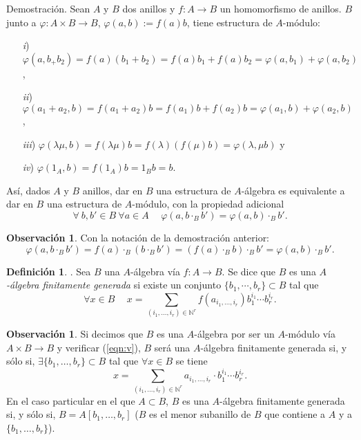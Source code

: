 \documentclass[a4paper,12pt]{article}
\newcommand{\N}{\mathbb{N}}
\theoremstyle{definition}
\newtheorem{definition}[theorem]{Definición}
\newtheorem{remark}[theorem]{Observación}
\begin{document}
Demostración. Sean $A$ y $B$ dos anillos y $f: A\longrightarrow B$ un homomorfismo de anillos. $B$ junto a $\varphi: A\times B\longrightarrow B$, $\varphi(a,b):=f(a)b$, tiene estructura de $A$-módulo:\begin{itemize}
    \item [\textit{i})]$\varphi(a,b_+b_2)=f(a)(b_1+b_2)=f(a)b_1+f(a)b_2=\varphi(a,b_1)+\varphi(a,b_2)$,
    \item[\textit{ii})]$\varphi(a_1+a_2,b)=f(a_1+a_2)b=f(a_1)b+f(a_2)b=\varphi(a_1,b)+\varphi(a_2,b)$,
    \item[\textit{iii})]$\varphi(\lambda\mu,b)=f(\lambda\mu)b=f(\lambda)(f(\mu)b)=\varphi(\lambda,\mu b)$ y
    \item[\textit{iv})]$\varphi(1_A,b)=f(1_A)b=1_Bb=b$.
\end{itemize}
Así, dados $A$ y $B$ anillos, dar en $B$ una estructura de $A$-álgebra es equivalente a dar en $B$ una estructura de $A$-módulo, con la propiedad adicional\begin{equation} \label{eqn:v} \forall\ b,b'\in B\ \forall a\in A\hspace{15pt} \varphi(a,b\cdot_B b')=\varphi(a, b)\cdot_B b'.\end{equation}

\begin{remark} Con la notación de la demostración anterior:$$\varphi(a,b\cdot_B b')=f(a)\cdot_B(b\cdot_B b')=(f(a)\cdot_B b)\cdot_B b'=\varphi(a,b)\cdot_B b'.$$
\end{remark}

\begin{definition}. Sea $B$ una $A$-álgebra vía $f: A\longrightarrow B$. Se dice que $B$ es una \textit{$A$-álgebra finitamente generada} si existe un conjunto $\{b_1,\cdots,b_r\}\subset B$ tal que$$\forall x\in B\hspace{15pt}x=\sum_{(i_1,\dots,i_r)\in{\N}^r}f(a_{i_1,\dots,i_r})b_1^{i_1}\cdots b_r^{i_r}.$$
\end{definition}

\begin{remark} Si decimos que $B$ es una $A$-álgebra por ser un $A$-módulo vía $A\times B\longrightarrow B$ y verificar (\ref{eqn:v}), $B$ será una $A$-álgebra finitamente generada si, y sólo si, $\exists\{b_1,\dots,b_r\}\subset B$ tal que $\forall x\in B$ se tiene\begin{equation} \label{eqn:2}x=\sum_{(i_1,\dots,i_r)\in{\N}^r}a_{i_1,\dots,i_r}\cdot b_1^{i_1}\cdots b_r^{i_r}.\end{equation}
En el caso particular en el que $A\subset B$, $B$ es una $A$-álgebra finitamente generada si, y sólo si, $B=A[b_1,\dots,b_r]$ ($B$ es el menor subanillo de $B$ que contiene a $A$ y a $\{b_1,\dots,b_r\}$).
\end{remark}
\end{document}
